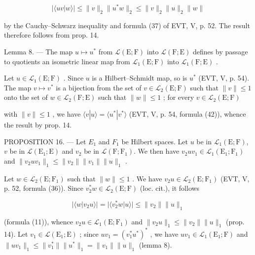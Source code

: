 \[
| \langle u v | w \rangle | \leqslant \| v \| _ {2} \| u ^ {*} w \| _ {2} \leqslant \| v \| _ {2} \| u \| _ {2} \| w \|
\]

by the Cauchy--Schwarz inequality and formula (37) of EVT, V, p. 52. The result therefore follows from prop. 14.

Lemma 8. --- The map \(u \mapsto u^{*}\) from \(\mathcal{L}(\mathrm{E};\mathrm{F})\) into \(\mathcal{L}(\mathrm{F};\mathrm{E})\) defines by passage to quotients an isometric linear map from \(\mathcal{L}_{1}(\mathrm{E};\mathrm{F})\) into \(\mathcal{L}_{1}(\mathrm{F};\mathrm{E})\) .

Let \(u \in \mathcal{L}_1(\mathrm{E};\mathrm{F})\) . Since \(u\) is a Hilbert--Schmidt map, so is \(u^*\) (EVT, V, p. 54). The map \(v \mapsto v^*\) is a bijection from the set of \(v \in \mathcal{L}_2(\mathrm{E};\mathrm{F})\) such that \(\|v\| \leqslant 1\) onto the set of \(w \in \mathcal{L}_2(\mathrm{F};\mathrm{E})\) such that \(\|w\| \leqslant 1\) ; for every \(v \in \mathcal{L}_2(\mathrm{E};\mathrm{F})\)

with \(\|v\|\leqslant1\) , we have \(\langle v|u\rangle=\langle u^{*}|v^{*}\rangle\) (EVT, V, p. 54, formula (42)), whence the result by prop. 14.

PROPOSITION 16. --- Let \(E_{1}\) and \(F_{1}\) be Hilbert spaces. Let \(u\) be in \(\mathcal{L}_{1}(\mathrm{E};\mathrm{F})\), \(v\) be in \(\mathcal{L}(\mathrm{E}_{1};\mathrm{E})\) and \(v_{2}\) be in \(\mathcal{L}(\mathrm{F};\mathrm{F}_{1})\). We then have \(v_{2}uv_{1} \in \mathcal{L}_{1}(\mathrm{E}_{1};\mathrm{F}_{1})\) and \(\|v_{2}uv_{1}\|_{1} \leqslant \|v_{2}\|\|v_{1}\|\|u\|_{1}\) .

Let \(w \in \mathcal{L}_2(\mathrm{E};\mathrm{F}_1)\) such that \(\| w\| \leqslant 1\) . We have \(v_{2}u \in \mathcal{L}_{2}(\mathrm{E};\mathrm{F}_{1})\) (EVT, V, p. 52, formula (36)). Since \(v_{2}^{*}w \in \mathcal{L}_{2}(\mathrm{E};\mathrm{F})\) (loc. cit.), it follows

\[
| \langle w | v _ {2} u \rangle | = | \langle v _ {2} ^ {*} w | u \rangle | \leqslant \| v _ {2} \| \| u \| _ {1}
\]

(formula (11)), whence \(v_2u \in \mathcal{L}_1(\mathrm{E};\mathrm{F}_1)\) and \(\| v_2u\| _1 \leqslant \| v_2\| \| u\| _1\) (prop. 14). Let \(v_{1} \in \mathcal{L}(\mathrm{E}_{1};\mathrm{E})\) ; since \(uv_{1} = (v_{1}^{*}u^{*})^{*}\) , we have \(uv_{1} \in \mathcal{L}_{1}(\mathrm{E}_{1};\mathrm{F})\) and \(\| uv_{1}\|_{1} \leqslant \| v_{1}^{*}\| \| u^{*}\|_{1} = \| v_{1}\| \| u\|_{1}\) (lemma 8).

